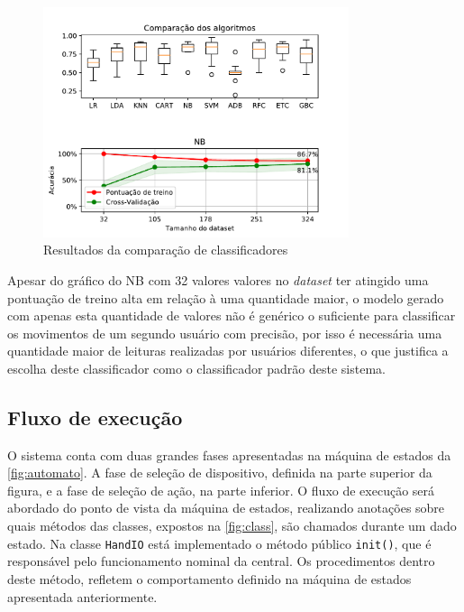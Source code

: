 \begin{figure}[ht]
    \centering
    \includegraphics[width=0.8\textwidth, keepaspectratio]{resources/comparacao.pdf}
    \caption{Resultados da comparação de classificadores}
    \label{fig:classificadores}
\end{figure}

Apesar do gráfico do NB com 32 valores valores no \textit{dataset} ter atingido uma pontuação de treino alta em relação à uma quantidade maior, o modelo gerado com apenas esta quantidade de valores não é genérico o suficiente para classificar os movimentos de um segundo usuário com precisão, por isso é necessária uma quantidade maior de leituras realizadas por usuários diferentes, o que justifica a escolha deste classificador como o classificador padrão deste sistema.

\subsection{Fluxo de execução}

O sistema conta com duas grandes fases apresentadas na máquina de estados da \autoref{fig:automato}. A fase de seleção de dispositivo, definida na parte superior da figura, e a fase de seleção de ação, na parte inferior. O fluxo de execução será abordado do ponto de vista da máquina de estados, realizando anotações sobre quais métodos das classes, expostos na \autoref{fig:class}, são chamados durante um dado estado. 
% 
Na classe \texttt{HandIO} está implementado o método público \texttt{init()}, que é responsável pelo funcionamento nominal da central. Os procedimentos dentro deste método, refletem o comportamento definido na máquina de estados apresentada anteriormente.

